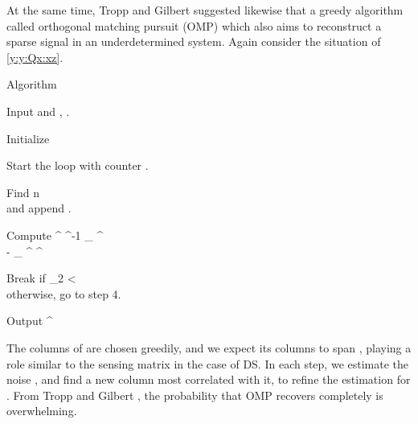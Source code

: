 At the same time, Tropp and Gilbert \cite {TrG07b} suggested likewise that a greedy algorithm called orthogonal matching pursuit (OMP) which also aims to reconstruct a sparse signal in an underdetermined system.
Again consider the situation of \ref {y:y:Qx:xz}.

\Result
{Algorithm}
{
\startitemize[n]
%
\item Input  and , .
%
\item Initialize
%
%
\item Start the loop with counter .
%
\item Find
%
 {
n
\leftarrow {} {}
 \\
}
%
and append .
%
\item Compute
%
 {
 ^\ddagger
\leftarrow {} ^{-1}  _{} ^\dagger \\
%
\leftarrow {} - _{} ^\dagger {} ^\ddagger {} \\
}
%
\item Break if
%
 {
 _2
<\eta \\
}
%
otherwise, go to step 4.
%
\item Output 
%
 {
\leftarrow {} ^\ddagger {} \\
}
\stopitemize
}
%
The columns of  are chosen greedily, and we expect its columns to span , playing a role similar to the sensing matrix in the case of DS.
In each step, we estimate the noise , and find a new column most correlated with it, to refine the estimation for .
From Tropp and Gilbert \cite {TrG07a}, the probability that OMP recovers  completely is overwhelming.

